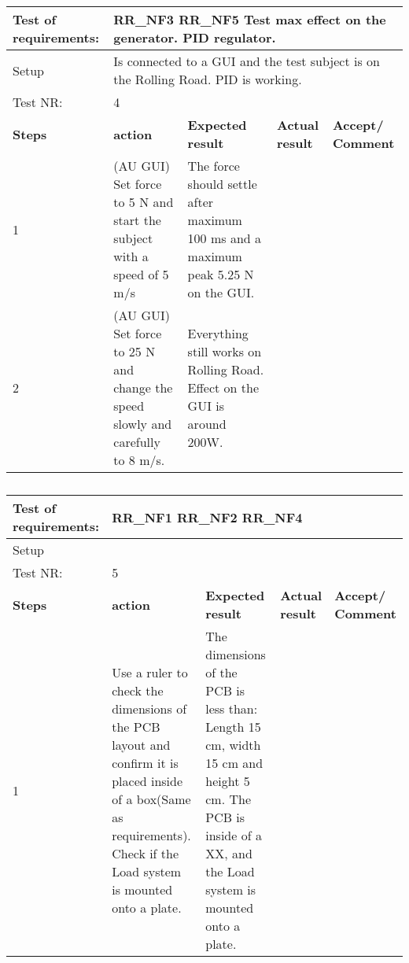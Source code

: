 \begin{table}[h!]
	\centering
	\label{my-label}	
	\begin{tabular}{|p{1.5 cm}|p{4.2 cm}|p{2.1 cm}|p{2.1 cm}|p{2.1 cm}|}
		\hline
		Test of requirements: 
		& \multicolumn{4}{l|}{RR\_NF3 RR\_NF5  Test max effect on the generator.	PID regulator.} \\ \hline
		Setup 
		& \multicolumn{4}{l|}{Is connected to a GUI and the test subject is on the Rolling Road. PID is working.} \\ \hline
		Test NR:
		& \multicolumn{4}{l|}{4} \\ \hline
		\textbf{Steps} & \textbf{action} & \textbf{Expected result} & 
		\textbf{Actual result} & \textbf{Accept/ Comment} \\ \hline
		1 
		& (AU GUI) Set force to 5 N and start the subject with a speed of 5 m/s  
		& The force should settle after maximum 100 ms and a maximum peak 5.25 N on the GUI.  
		&
		& \\ \hline
		2
		& (AU GUI) Set force to 25 N and change the speed slowly and carefully to 8 m/s.
		& Everything still works on Rolling Road. Effect on the GUI is around 200W.
		&
		& \\ \hline
	\end{tabular}
	\caption{}
\end{table}

\begin{table}[h!]
	\centering
	\label{my-label}	
	\begin{tabular}{|p{1.5 cm}|p{4.2 cm}|p{2.1 cm}|p{2.1 cm}|p{2.1 cm}|}
		\hline
		Test of requirements: 
		& \multicolumn{4}{l|}{RR\_NF1 RR\_NF2 RR\_NF4} \\ \hline
		Setup 
		& \multicolumn{4}{l|}{} \\ \hline
		Test NR:
		& \multicolumn{4}{l|}{5} \\ \hline
		\textbf{Steps} & \textbf{action} & \textbf{Expected result} & 
		\textbf{Actual result} & \textbf{Accept/ Comment} \\ \hline
		1 
		& Use a ruler to check the dimensions of the PCB layout and confirm it is placed inside of a box(Same as requirements). Check if the Load system is mounted onto a plate.
		& The dimensions of the PCB is less than: Length 15 cm, width 15 cm and height 5 cm. The PCB is inside of a XX, and the Load system is mounted onto a plate.
		&
		& \\ \hline
	\end{tabular}
	\caption{}
\end{table}


